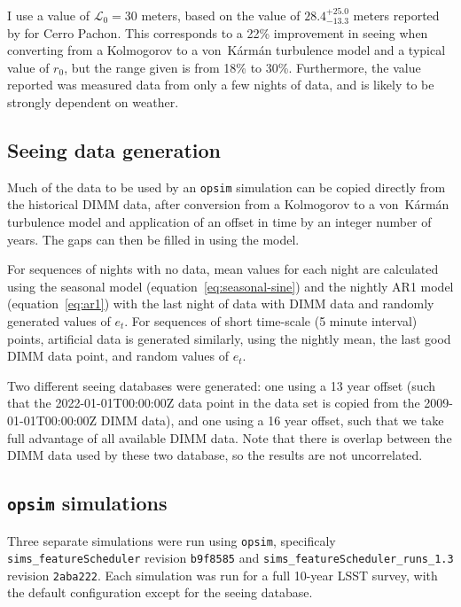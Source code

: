 \documentclass[DM,authoryear,toc]{lsstdoc}
\begin{document}
I use a value of $\mathcal{L}_0 = 30$ meters, based on the
value of $28.4^{+25.0}_{-13.3}$ meters reported by
\cite{2000ApOpt..39.5415Z} for Cerro Pachon. This corresponds to a 22\%
improvement in seeing when converting from a Kolmogorov to a
von~K\'arm\'an turbulence model and a typical value of $r_0$, but the
range given is from 18\% to 30\%. Furthermore, the value reported was
measured data from only a few nights of data, and is likely to be
strongly dependent on weather.

\subsection{Seeing data generation}
\label{sec:data-generation}

Much of the data to be used by an \texttt{opsim} simulation can be copied
directly from the historical DIMM data, after conversion from a
Kolmogorov to a von~K\'arm\'an turbulence model and application of an
offset in time by an integer number of years. The gaps can then be
filled in using the model.

For sequences of nights with no data, mean values for each night are
calculated using the seasonal model (equation~\ref{eq:seasonal-sine})
and the nightly AR1 model (equation~\ref{eq:ar1}) with the last night
of data with DIMM data and randomly generated values of $e_t$. For
sequences of short time-scale (5 minute interval) points, artificial
data is generated similarly, using the nightly mean, the last good
DIMM data point, and random values of $e_t$.

Two different seeing databases were generated: one using a 13 year
offset (such that the 2022-01-01T00:00:00Z data point in the data set
is copied from the 2009-01-01T00:00:00Z DIMM data), and one using a 16
year offset, such that we take full advantage of all available DIMM
data. Note that there is overlap between the DIMM data used by these
two database, so the results are not uncorrelated.

\subsection{\texttt{opsim} simulations}
\label{sec:simulations}

Three separate simulations were run using \texttt{opsim}, specificaly
\texttt{sims\_featureScheduler} revision \texttt{b9f8585} and
\texttt{sims\_featureScheduler\_runs\_1.3} revision
\texttt{2aba222}. Each simulation was run for a full 10-year LSST
survey, with the default configuration except for the seeing database.
\end{document}
